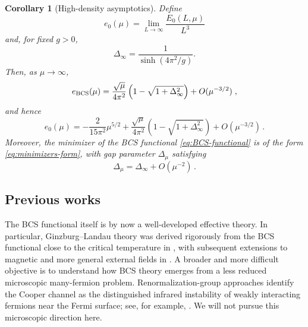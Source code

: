 \documentclass[11pt]{amsart}
\newtheorem{corollary}[definition]{Corollary}
\theoremstyle{definition}
\numberwithin{equation}{section}
\newcommand{\1}{\mathbf 1}
\begin{document}
\begin{corollary}[High-density asymptotics]\label{cor:high-density}
Define
\[
 e_0(\mu)=\lim_{L\to\infty}\frac{E_0(L,\mu)}{L^3}
\]
and, for fixed \(g>0\),
\begin{equation}\label{eq:Delta-infty}
 \Delta_\infty=\frac1{\sinh(4\pi^2/g)}.
\end{equation}
Then, as \(\mu\to\infty\),
\begin{equation}
    e_{\rm BCS}(\mu) =\frac{\sqrt\mu}{4\pi^2}
 \left(1-\sqrt{1+\Delta_\infty^2}\right)
 +O(\mu^{-3/2})\;,
\end{equation}
and hence
\begin{equation}
    e_0(\mu) = -\frac{2}{15\pi^2}\mu^{5/2}
 +\frac{\sqrt\mu}{4\pi^2}
 \left(1-\sqrt{1+\Delta_\infty^2}\right)
 +O(\mu^{-3/2})\,.
\end{equation}
Moreover, the minimizer of the BCS functional \ref{eq:BCS-functional} is of the form \eqref{eq:minimizers-form}, with gap parameter $\Delta_{\mu}$ satisfying
\begin{equation}\label{eq:gap-high-density}
    \Delta_{\mu} = \Delta_{\infty} + O(\mu^{-2})\,.
\end{equation}
\end{corollary}




\subsection{Previous works}

The BCS functional itself is by now a well-developed effective theory. In particular,
Ginzburg--Landau theory was derived rigorously from the BCS functional close to the
critical temperature in \cite{FrankHainzlSeiringerSolovej2012}, with subsequent extensions
to magnetic and more general external fields in
\cite{DeuchertHainzlMaier2023Homogeneous,DeuchertHainzlMaier2023General}. A broader and
more difficult objective is to understand how BCS theory emerges from a less reduced
microscopic many-fermion problem. Renormalization-group approaches identify the Cooper
channel as the distinguished infrared instability of weakly interacting fermions near the
Fermi surface; see, for example,
\cite{FeldmanTrubowitz1990,FeldmanTrubowitz1991,FeldmanMagnenRivasseauTrubowitz1992,
FeldmanMagnenRivasseauTrubowitz1993,ChenFroehlichSeifert1996}. We will not pursue this
microscopic direction here.
\end{document}
